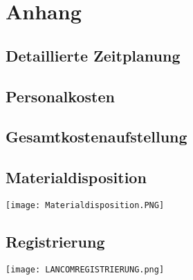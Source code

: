 \section{Anhang}
\subsection{Detaillierte Zeitplanung}
\label{app:Zeitplanung}

\subsection{Personalkosten}
\label{app:Personalkosten}
\subsection{Gesamtkostenaufstellung}
\label{app:Gesamtkostenaufstellung}

\clearpage

%
\subsection{Materialdisposition}
\label{app:Materialdisposition}
\texttt{[image: Materialdisposition.PNG]}

\subsection{Registrierung}
\label{Registrierung}
\texttt{[image: LANCOMREGISTRIERUNG.png]}
\clearpage

